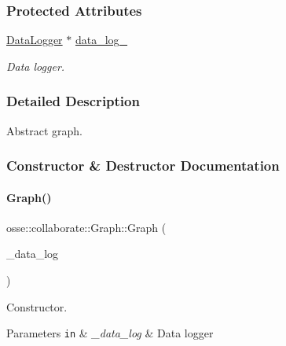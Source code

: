 \subsubsection*{Protected Attributes}
\begin{DoxyCompactItemize}
\item 
\mbox{\label{classosse_1_1collaborate_1_1_graph_a33e2d89c03913f2bb033a215b5f1efa6}} 
\hyperlink{classosse_1_1collaborate_1_1_data_logger}{Data\+Logger} $\ast$ \hyperlink{classosse_1_1collaborate_1_1_graph_a33e2d89c03913f2bb033a215b5f1efa6}{data\+\_\+log\+\_\+}
\begin{DoxyCompactList}\small\item\em Data logger. \end{DoxyCompactList}\end{DoxyCompactItemize}


\subsubsection{Detailed Description}
Abstract graph. 

\subsubsection{Constructor \& Destructor Documentation}
\mbox{\label{classosse_1_1collaborate_1_1_graph_aa6e69d08b74393ecfa68cbf915d7eabc}} 
\paragraph{\texorpdfstring{Graph()}{Graph()}}
{\footnotesize\ttfamily osse\+::collaborate\+::\+Graph\+::\+Graph (\begin{DoxyParamCaption}\item[{\hyperlink{classosse_1_1collaborate_1_1_data_logger}{Data\+Logger} $\ast$}]{\+\_\+data\+\_\+log }\end{DoxyParamCaption})\hspace{0.3cm}{\ttfamily [explicit]}}



Constructor. 


\begin{DoxyParams}[1]{Parameters}
\mbox{\tt in}  & {\em \+\_\+data\+\_\+log} & Data logger \\
\hline
\end{DoxyParams}


